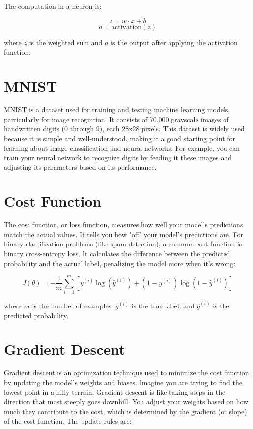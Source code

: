 The computation in a neuron is:

\[
z = w \cdot x + b
\]
\[
a = \text{activation}(z)
\]

where \( z \) is the weighted sum and \( a \) is the output after applying the activation function.

\section{MNIST}
MNIST is a dataset used for training and testing machine learning models, particularly for image recognition. It consists of 70,000 grayscale images of handwritten digits (0 through 9), each 28x28 pixels. This dataset is widely used because it is simple and well-understood, making it a good starting point for learning about image classification and neural networks. For example, you can train your neural network to recognize digits by feeding it these images and adjusting its parameters based on its performance.

\section{Cost Function}
The cost function, or loss function, measures how well your model's predictions match the actual values. It tells you how "off" your model's predictions are. For binary classification problems (like spam detection), a common cost function is binary cross-entropy loss. It calculates the difference between the predicted probability and the actual label, penalizing the model more when it’s wrong:

\[
J(\theta) = -\frac{1}{m} \sum_{i=1}^{m} \left[ y^{(i)} \log\left( \hat{y}^{(i)} \right) + \left(1 - y^{(i)} \right) \log\left( 1 - \hat{y}^{(i)} \right) \right]
\]

where \( m \) is the number of examples, \( y^{(i)} \) is the true label, and \( \hat{y}^{(i)} \) is the predicted probability.

\section{Gradient Descent}
Gradient descent is an optimization technique used to minimize the cost function by updating the model's weights and biases. Imagine you are trying to find the lowest point in a hilly terrain. Gradient descent is like taking steps in the direction that most steeply goes downhill. You adjust your weights based on how much they contribute to the cost, which is determined by the gradient (or slope) of the cost function. The update rules are:

